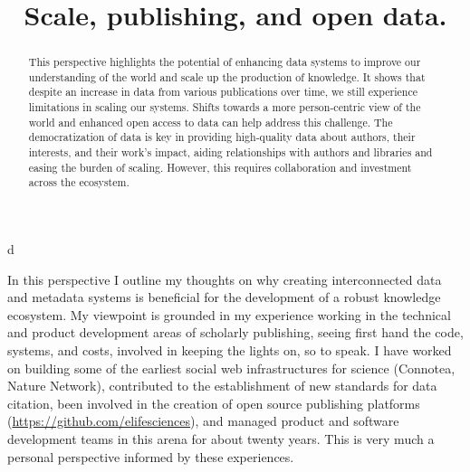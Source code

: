 \documentclass[]{hdsr}
\begin{document}




\begin{center}

  \title{Scale, publishing, and open data.}
  \maketitle

  \thispagestyle{empty}
  
  \vspace*{.2in}

d

\begin{abstract}
This perspective highlights the potential of enhancing data systems to improve our understanding of the world and scale up the production of knowledge. It shows that despite an increase in data from various publications over time, we still experience limitations in scaling our systems. Shifts towards a more person-centric view of the world and enhanced open access to data can help address this challenge. The democratization of data is key in providing high-quality data about authors, their interests, and their work's impact, aiding relationships with authors and libraries and easing the burden of scaling. However, this requires collaboration and investment across the ecosystem.    
\end{abstract}
\end{center}

  
\copyrightnotice



\label{sec1}
In this perspective I outline my thoughts on why creating interconnected data and metadata systems is beneficial for the development of a robust knowledge ecosystem. My viewpoint is grounded in my experience working in the technical and product development areas of scholarly publishing, seeing first hand the code, systems, and costs, involved in keeping the lights on, so to speak. I have worked on building some of the earliest social web infrastructures for science (Connotea, Nature Network), contributed to the establishment of new standards for data citation, been involved in the creation of open source publishing platforms (\href{https://github.com/elifesciences}{https://github.com/elifesciences}), and managed product and software development teams in this arena for about twenty years. This is very much a personal perspective informed by these experiences.
\end{document}
